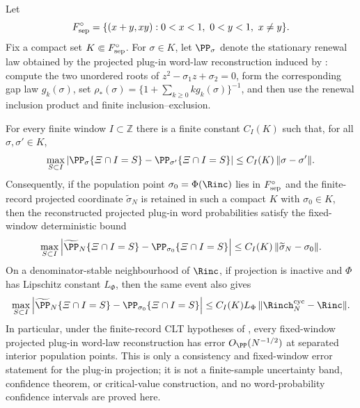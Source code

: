\begin{lemma}\label{lem:projected-complete-law-fixed-window-error-main}
Let
\[
F_{\rm sep}^{\circ}
=\{(x+y,xy):0<x<1,\ 0<y<1,\ x\ne y\}.
\]
Fix a compact set \(K\Subset F_{\rm sep}^{\circ}\).  For
\(\sigma\in K\), let \(\PP_\sigma\) denote the stationary renewal law
obtained by the projected plug-in word-law reconstruction induced by
: compute the two
unordered roots of \(z^2-\sigma_1z+\sigma_2=0\), form the corresponding
gap law \(g_k(\sigma)\), set
\(\rho_*(\sigma)=\{1+\sum_{k\ge0}k g_k(\sigma)\}^{-1}\), and then use the
renewal inclusion product and finite inclusion--exclusion.

For every finite window \(I\subset\mathbb Z\) there is a finite constant
\(C_I(K)\) such that, for all \(\sigma,\sigma'\in K\),
\begin{equation}\label{eq:projected-complete-law-fixed-window-lipschitz-main}
\max_{S\subset I}
\left|\PP_\sigma\{\varXi\cap I=S\}
      -\PP_{\sigma'}\{\varXi\cap I=S\}\right|
\le C_I(K)\,\|\sigma-\sigma'\| .
\end{equation}
Consequently, if the population point \(\sigma_0=\Phi(\Rinc)\) lies in
\(F_{\rm sep}^{\circ}\) and the finite-record projected coordinate
\(\widetilde\sigma_N\) is retained in such a compact \(K\) with
\(\sigma_0\in K\), then the reconstructed projected plug-in word probabilities
satisfy the fixed-window deterministic bound
\begin{equation}\label{eq:finite-record-projected-word-error-bound-main}
\max_{S\subset I}
\left|\widetilde\PP_N\{\varXi\cap I=S\}
      -\PP_{\sigma_0}\{\varXi\cap I=S\}\right|
\le C_I(K)\,\|\widetilde\sigma_N-\sigma_0\|.
\end{equation}
On a denominator-stable neighbourhood of \(\Rinc\), if projection is inactive and
\(\Phi\) has Lipschitz constant \(L_\Phi\), then the same event also gives
\[
\max_{S\subset I}
\left|\widetilde\PP_N\{\varXi\cap I=S\}
      -\PP_{\sigma_0}\{\varXi\cap I=S\}\right|
\le C_I(K)L_\Phi\,\|\Rinch_N^{\mathrm{cyc}}-\Rinc\|.
\]
In particular, under the finite-record CLT hypotheses of
, every fixed-window projected
plug-in word-law reconstruction has error \(O_{\PP}(N^{-1/2})\) at separated
interior population points.  This is only a consistency and fixed-window error
statement for the plug-in projection; it is not a finite-sample uncertainty
band, confidence theorem, or critical-value construction, and no
word-probability confidence intervals are proved here.
\end{lemma}

